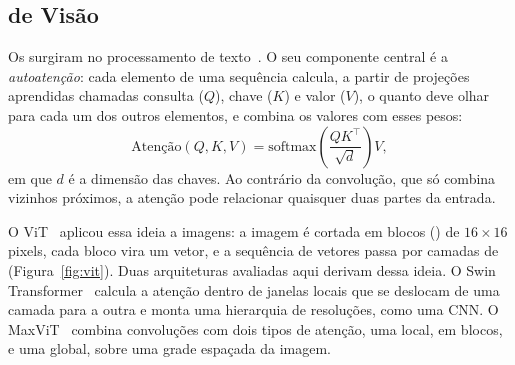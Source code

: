 \subsection{\texorpdfstring{}{Transformers} de Visão}
\label{sec:vit_background}

Os  surgiram no processamento de texto~\cite{vaswani2017attention}. O seu componente central é a \emph{autoatenção}: cada elemento de uma sequência calcula, a partir de projeções aprendidas chamadas consulta ($Q$), chave ($K$) e valor ($V$), o quanto deve olhar para cada um dos outros elementos, e combina os valores com esses pesos:
\begin{equation}
\mathrm{Atenção}(Q, K, V) = \mathrm{softmax}\!\left(\frac{Q K^{\top}}{\sqrt{d}}\right) V,
\end{equation}
em que $d$ é a dimensão das chaves. Ao contrário da convolução, que só combina vizinhos próximos, a atenção pode relacionar quaisquer duas partes da entrada.

O \gls{ViT}~\cite{dosovitskiy2021image} aplicou essa ideia a imagens: a imagem é cortada em blocos () de $16 \times 16$ pixels, cada bloco vira um vetor, e a sequência de vetores passa por camadas de  (Figura~\ref{fig:vit}). Duas arquiteturas avaliadas aqui derivam dessa ideia. O Swin Transformer~\cite{liu2021swin} calcula a atenção dentro de janelas locais que se deslocam de uma camada para a outra e monta uma hierarquia de resoluções, como uma CNN. O MaxViT~\cite{tu2022maxvit} combina convoluções com dois tipos de atenção, uma local, em blocos, e uma global, sobre uma grade espaçada da imagem.

